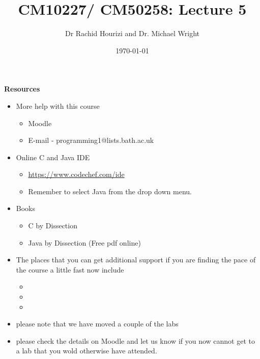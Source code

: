 \documentclass{beamer}
\begin{document}

\title{CM10227/ CM50258: Lecture 5}
\author{Dr Rachid Hourizi and Dr. Michael Wright}
\date{\today}
\frame{\titlepage}

\begin{frame}
\begin{center}
\textbf{Resources}
\end{center}
\begin{itemize}
\item More help with this course
\begin{itemize}
\item Moodle
\item E-mail - programming1@lists.bath.ac.uk
\end{itemize}
\item Online C \alert{and Java} IDE
\begin{itemize}
\item \url{https://www.codechef.com/ide}
\item Remember to select Java from the drop down menu.
\end{itemize}
\item Books
\begin{itemize}
\item C by Dissection
\item Java by Dissection (Free pdf online)
\end{itemize}
\end{itemize}
\end{frame}

\begin{frame} 
\begin{itemize}
\item The places that you can get additional support if you are finding the pace of the course a little fast now include
\begin{itemize}
\item {}
\item {}
\item {}
\end{itemize}
\item please note that we have moved a couple of the labs
\item please check the details on Moodle and let us know if you now cannot get to a lab that you wold otherwise have attended.
\end{itemize}
\end{frame}
\end{document}
